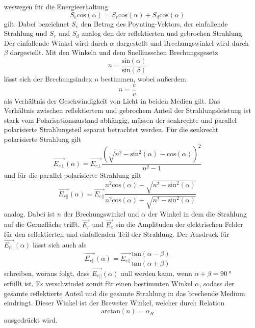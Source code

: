 weswegen für die Energieerhaltung
\begin{equation*}
    S_e \text{cos}(\alpha) = S_r \text{cos}(\alpha) + S_d \text{cos}(\alpha)
\end{equation*}
gilt. Dabei bezeichnet $S_e$ den Betrag des Poynting-Vektors, der einfallende Strahlung und $S_r$ 
und $S_d$ analog den der reflektierten und gebrochen Strahlung. Der einfallende Winkel wird durch 
$\alpha$ dargestellt und Brechungswinkel wird durch $\beta$ dargestellt.
Mit den Winkeln und dem Snelliusschen Brechungsgesetz
\begin{equation*}
    n = \frac{\text{sin}(\alpha)}{\text{sin}(\beta)}
    \label{eqn:snellius}
\end{equation*}
lässt sich der Brechungsindex $n$ bestimmen, wobei außerdem 
\begin{equation}
    n = \frac{c}{v}
    \label{eqn:verhältnis}
\end{equation}
als Verhältnis der Geschwindigkeit von Licht in beiden Medien gilt.
Das Verhältnis zwischen reflektiertem und gebrochem Anteil der Strahlungsleistung ist
stark vom Polarisationszustand abhängig, müssen der senkrechte und parallel polarisierte
Strahlungsteil separat betrachtet werden. 
Für die senkrecht polarisierte Strahlung gilt
\begin{equation}
    \vec{E_{r\bot}}(\alpha) = \vec{E_{e\bot}} \frac{(\sqrt{n^2 - \text{sin}^2(\alpha)} - \text{cos}(\alpha))^2}{n^2 - 1}
    \label{eqn:senkrecht}
\end{equation}
und für die parallel polarisierte Strahlung gilt 
\begin{equation}
    \vec{E_{r||}}(\alpha) = \vec{E_{e||}} \frac{n^2 \text{cos}(\alpha) - \sqrt{n^2 - \text{sin}^2(\alpha)}}{n^2 \text{cos}(\alpha) + \sqrt{n^2 - \text{sin}^2(\alpha)}}
    \label{eqn:parallel}
\end{equation}
analog. Dabei ist $n$ der Brechungswinkel und $\alpha$ der Winkel in dem die Strahlung auf die Gernzfläche trifft.
$\vec{E_r}$ und $\vec{E_e}$ sin die Amplituden der elektrischen Felder für den reflektierten und einfallenden Teil der 
Strahlung. Der Ausdruck für $\vec{E_{r||}}(\alpha)$ lässt sich auch als 
\begin{equation}
    \vec{E_{r||}}(\alpha) = \vec{E_{e||}}\frac{\text{tan}(\alpha - \beta)}{\text{tan}(\alpha + \beta)}
\end{equation}
schreiben, woraus folgt, dass $\vec{E_{r||}}(\alpha)$ null werden kann, wenn $\alpha + \beta = \qty{90}{\degree}$
erfüllt ist. Es verschwindet somit für einen bestimmten Winkel $\alpha$, sodass der gesamte reflektierte Anteil
und die gesamte Strahlung in das brechende Medium eindringt. Dieser Winkel ist der Brewster Winkel, welcher durch Relation
\begin{equation}
    \text{arctan}(n) =\alpha_B
\end{equation}
ausgedrückt wird.